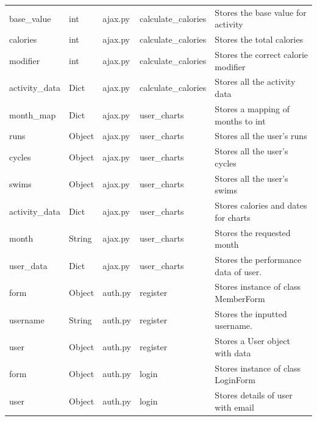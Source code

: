 \documentclass{article}[12pt,a4paper]
\begin{document}
\begin{table}[h]
\begin{tabular}{lllll}
base\_value       & int           & ajax.py             & calculate\_calories       & Stores the base value for activity      \\
calories          & int           & ajax.py             & calculate\_calories       & Stores the total calories               \\
modifier          & int           & ajax.py             & calculate\_calories       & Stores the correct calorie modifier     \\
activity\_data    & Dict          & ajax.py             & calculate\_calories       & Stores all the activity data            \\
month\_map        & Dict          & ajax.py             & user\_charts              & Stores a mapping of months to int       \\
runs              & Object        & ajax.py             & user\_charts              & Stores all the user's runs              \\
cycles            & Object        & ajax.py             & user\_charts              & Stores all the user's cycles            \\
swims             & Object        & ajax.py             & user\_charts              & Stores all the user's swims             \\
activity\_data    & Dict          & ajax.py             & user\_charts              & Stores calories and dates for charts    \\
month             & String        & ajax.py             & user\_charts              & Stores the requested month              \\
user\_data        & Dict          & ajax.py             & user\_charts              & Stores the performance data of user.    \\
form              & Object        & auth.py             & register                  & Stores instance of class MemberForm     \\
username          & String        & auth.py             & register                  & Stores the inputted username.           \\
user              & Object        & auth.py             & register                  & Stores a User object with data          \\
form              & Object        & auth.py             & login                     & Stores instance of class LoginForm      \\
user              & Object        & auth.py             & login                     & Stores details of user with email       \\

\end{tabular}
\end{table}
\end{document}
